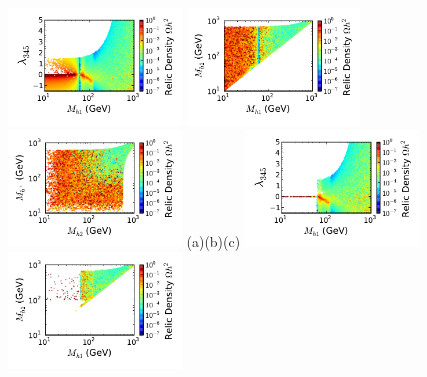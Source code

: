 \documentclass[12pt,a4paper]{article}
\begin{document}
\begin{figure}[htb]
\vskip -1.0cm
\hspace*{-0.3cm}\includegraphics[width=0.41\textwidth]{Mh1_ld345_Omega_large-cut12.pdf}%
\hspace*{-1.78cm}\includegraphics[width=0.41\textwidth]{Mh1_Mh2_Omega_large-cut12.pdf}%
\hspace*{-1.77cm}\includegraphics[width=0.41\textwidth]{Mhc_Mh2_Omega_large-cut12.pdf}%
\vskip -1.1cm
\hspace*{1.2cm}(a)\hspace*{0.35\textwidth}\hspace*{-1.3cm}(b)\hspace*{0.35\textwidth}\hspace*{-1.2cm}(c)
\vskip 0.0cm
{\hspace*{-0.3cm}\includegraphics[width=0.41\textwidth]{Mh1_ld345_Omega_large-cut123456.pdf}}%
{\hspace*{-1.78cm}\includegraphics[width=0.41\textwidth]{Mh1_Mh2_Omega_large-cut123456.pdf}}%

\end{figure}
\end{document}
